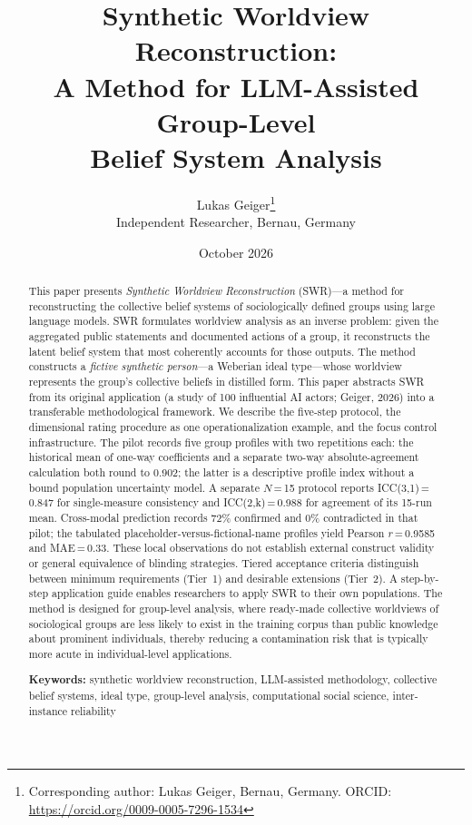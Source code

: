 \documentclass[11pt,a4paper]{article}
\title{%
  \sffamily\bfseries
  Synthetic Worldview Reconstruction:\\[0.3em]
  \large A Method for LLM-Assisted Group-Level\\
  Belief System Analysis%
}
\author{%
  Lukas Geiger\thanks{Corresponding author: Lukas Geiger, Bernau, Germany. ORCID: \url{https://orcid.org/0009-0005-7296-1534}}\\[0.3em]
  \small Independent Researcher, Bernau, Germany
}
\date{October 2026}
\begin{document}
\hypersetup{pageanchor=false}
\maketitle
\thispagestyle{empty}

\begin{abstract}
\noindent
This paper presents \emph{Synthetic Worldview Reconstruction} (SWR)---a method for reconstructing the collective belief systems of sociologically defined groups using large language models. SWR formulates worldview analysis as an inverse problem: given the aggregated public statements and documented actions of a group, it reconstructs the latent belief system that most coherently accounts for those outputs. The method constructs a \emph{fictive synthetic person}---a Weberian ideal type---whose worldview represents the group's collective beliefs in distilled form. This paper abstracts SWR from its original application (a study of 100 influential AI actors; Geiger, 2026) into a transferable methodological framework. We describe the five-step protocol, the dimensional rating procedure as one operationalization example, and the focus control infrastructure. The pilot records five group profiles with two repetitions each: the historical mean of one-way coefficients and a separate two-way absolute-agreement calculation both round to 0.902; the latter is a descriptive profile index without a bound population uncertainty model. A separate $N$\,=\,15 protocol reports ICC(3,1)\,=\,0.847 for single-measure consistency and ICC(2,k)\,=\,0.988 for agreement of its 15-run mean. Cross-modal prediction records 72\% confirmed and 0\% contradicted in that pilot; the tabulated placeholder-versus-fictional-name profiles yield Pearson $r$\,=\,0.9585 and MAE\,=\,0.33. These local observations do not establish external construct validity or general equivalence of blinding strategies. Tiered acceptance criteria distinguish between minimum requirements (Tier~1) and desirable extensions (Tier~2). A step-by-step application guide enables researchers to apply SWR to their own populations. The method is designed for group-level analysis, where ready-made collective worldviews of sociological groups are less likely to exist in the training corpus than public knowledge about prominent individuals, thereby reducing a contamination risk that is typically more acute in individual-level applications.

\medskip
\noindent\textbf{Keywords:} synthetic worldview reconstruction, LLM-assisted methodology, collective belief systems, ideal type, group-level analysis, computational social science, inter-instance reliability
\end{abstract}
\end{document}
